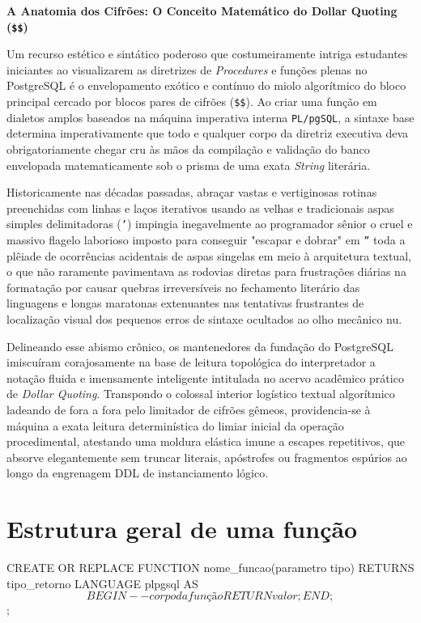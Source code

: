 \textbf{A Anatomia dos Cifrões: O Conceito Matemático do Dollar Quoting (\texttt{\$\$})}

Um recurso estético e sintático poderoso que costumeiramente intriga estudantes iniciantes ao visualizarem as diretrizes de \textit{Procedures} e funções plenas no PostgreSQL é o envelopamento exótico e contínuo do miolo algorítmico do bloco principal cercado por blocos pares de cifrões (\texttt{\$\$}). Ao criar uma função em dialetos amplos baseados na máquina imperativa interna \texttt{PL/pgSQL}, a sintaxe base determina imperativamente que todo e qualquer corpo da diretriz executiva deva obrigatoriamente chegar cru às mãos da compilação e validação do banco envelopada matematicamente sob o prisma de uma exata \textit{String} literária.

Historicamente nas décadas passadas, abraçar vastas e vertiginosas rotinas preenchidas com linhas e laços iterativos usando as velhas e tradicionais aspas simples delimitadoras (\texttt{'}) impingia inegavelmente ao programador sênior o cruel e massivo flagelo laborioso imposto para conseguir "escapar e dobrar" em \texttt{''} toda a plêiade de ocorrências acidentais de aspas singelas em meio à arquitetura textual, o que não raramente pavimentava as rodovias diretas para frustrações diárias na formatação por causar quebras irreversíveis no fechamento literário das linguagens e longas maratonas extenuantes nas tentativas frustrantes de localização visual dos pequenos erros de sintaxe ocultados ao olho mecânico nu. 

Delineando esse abismo crônico, os mantenedores da fundação do PostgreSQL imiscuíram corajosamente na base de leitura topológica do interpretador a notação fluida e imensamente inteligente intitulada no acervo acadêmico prático de \textit{Dollar Quoting}. Transpondo o colossal interior logístico textual algorítmico ladeando de fora a fora pelo limitador de cifrões gêmeos, providencia-se à máquina a exata leitura determinística do limiar inicial da operação procedimental, atestando uma moldura elástica imune a escapes repetitivos, que absorve elegantemente sem truncar literais, apóstrofes ou fragmentos espúrios ao longo da engrenagem DDL de instanciamento lógico.

\section{Estrutura geral de uma função}

\begin{sqlcode}
CREATE OR REPLACE FUNCTION nome_funcao(parametro tipo)
RETURNS tipo_retorno
LANGUAGE plpgsql
AS $$
BEGIN
    -- corpo da função
    RETURN valor;
END;
$$;
\end{sqlcode}

